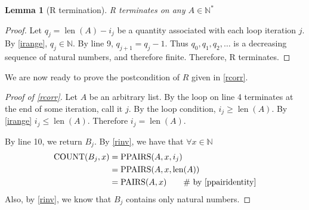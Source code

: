 \documentclass[boldsans]{article}
\newtheorem{lemma}[theorem]{Lemma}
\newcommand{\N}{\mathbb{N}}
\newcommand{\INLINE}[1]{\qquad \text{\# #1}}
\DeclareMathOperator{\len}{len}
\begin{document}
\begin{lemma}[R termination]
\label{rterm}
R terminates on any $A \in \N^*$
\end{lemma}
\begin{proof}
Let $q_j = \len(A) - i_j$ be a quantity associated with each loop iteration $j$. By  \ref{irange}, $q_j \in \N$. By line 9, $q_{j+1} = q_j - 1$. Thus $q_0, q_1, q_2, \ldots$ is a decreasing sequence of natural numbers, and therefore finite. Therefore, R terminates.
\end{proof}

We are now ready to prove the postcondition of $R$ given in \autoref{rcorr}.

\begin{proof}[Proof of \ref{rcorr}]
Let $A$ be an arbitrary list.
By  the loop on line 4 terminates at the end of some iteration, call it $j$. By the loop condition, $i_j \geq \len(A)$. By  \ref{irange} $i_j \leq \len(A)$. Therefore $i_j = \len(A)$.

By line 10, we return $B_j$. By \ref{rinv}, we have that $\forall x \in \N$
\begin{align*}
\COUNT(B_j, x) &= \ppairs(A, x, i_j) \\
&= \ppairs(A, x, \len(A)) \\
& = \pairs(A, x) \INLINE{by \Cref{ppairidentity}}
\end{align*}
Also, by \ref{rinv}, we know that $B_j$ contains only natural numbers.
\end{proof}
\end{document}
